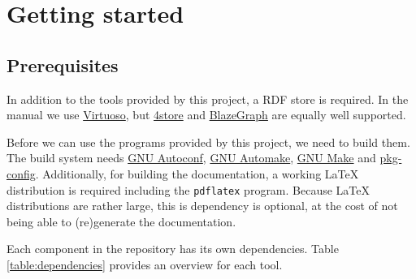 \chapter{Getting started}

\section{Prerequisites}
\label{sec:prerequisites}

  In addition to the tools provided by this project, a RDF store is required.
  In the manual we use \href{https://virtuoso.openlinksw.com/}{Virtuoso}, but
  \href{https://github.com/4store/4store}{4store} and
  \href{https://www.blazegraph.com/}{BlazeGraph} are equally well supported.

  Before we can use the programs provided by this project, we need to build
  them.  The build system needs
  \href{https://www.gnu.org/software/autoconf}{GNU Autoconf},
  \href{https://www.gnu.org/software/automake}{GNU Automake},
  \href{https://www.gnu.org/software/make}{GNU Make} and
  \href{https://www.freedesktop.org/wiki/Software/pkg-config/}{pkg-config}.
  Additionally, for building the documentation, a working \LaTeX{} distribution is
  required including the \texttt{pdflatex} program.  Because \LaTeX{} distributions
  are rather large, this is dependency is optional, at the cost of not being able
  to (re)generate the documentation.

  Each component in the repository has its own dependencies.  Table
  \ref{table:dependencies} provides an overview for each tool.

